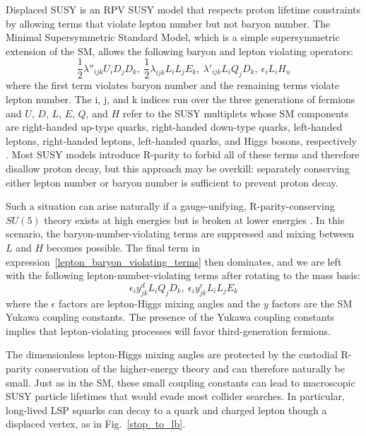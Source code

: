 Displaced SUSY is an RPV SUSY model that respects proton lifetime constraints by allowing terms that violate lepton number but not baryon number. The Minimal Supersymmetric Standard Model, which is a simple supersymmetric extension of the SM, allows the following baryon and lepton violating operators:
\begin{equation}
    \label{lepton_baryon_violating_terms}
    \frac{1}{2}\lambda''_{ijk}U_{i}D_{j}D_{k},\ \frac{1}{2}\lambda_{ijk}L_{i}L_{j}E_{k},\  \lambda'_{ijk}L_{i}Q_{j}D_{k},\  \epsilon_{i}L_{i}H_{u} 
\end{equation}
where the first term violates baryon number and the remaining terms violate lepton number. The i, j, and k indices run over the three generations of fermions and $U$, $D$, $L$, $E$, $Q$, and $H$ refer to the SUSY multiplets whose SM components are right-handed up-type quarks, right-handed down-type quarks, left-handed leptons, right-handed leptons, left-handed quarks, and Higgs bosons, respectively \cite{susy_primer}. Most SUSY models introduce R-parity to forbid all of these terms and therefore disallow proton decay, but this approach may be overkill: separately conserving either lepton number or baryon number is sufficient to prevent proton decay.

Such a situation can arise naturally if a gauge-unifying, R-parity-conserving $SU(5)$ theory exists at high energies but is broken at lower energies \cite{hall_suzuki_rpv}. In this scenario, the baryon-number-violating terms are suppressed and mixing between $L$ and $H$ becomes possible. The final term in expression~\eqref{lepton_baryon_violating_terms} then dominates, and we are left with the following lepton-number-violating terms after rotating to the mass basis:
\begin{equation}
    \label{displaced_susy_terms}
    \epsilon_{i}y^{d}_{jk}L_{i}Q_{j}D_{k},\ \epsilon_{i}y^{e}_{jk}L_{i}L_{j}E_{k} 
\end{equation}
where the $\epsilon$ factors are lepton-Higgs mixing angles and the $y$ factors are the SM Yukawa coupling constants. The presence of the Yukawa coupling constants implies that lepton-violating processes will favor third-generation fermions.

The dimensionless lepton-Higgs mixing angles are protected by the custodial R-parity conservation of the higher-energy theory and can therefore naturally be small. Just as in the SM, these small coupling constants can lead to macroscopic SUSY particle lifetimes that would evade most collider searches. In particular, long-lived LSP squarks can decay to a quark and charged lepton though a displaced vertex, as in Fig.~\ref{stop_to_lb}.

